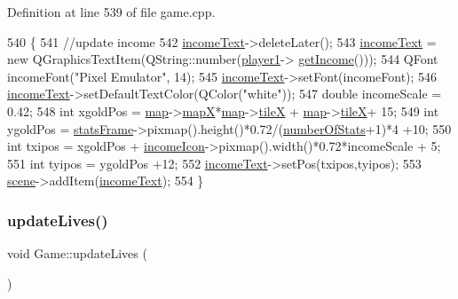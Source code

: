 Definition at line 539 of file game.\+cpp.


\begin{DoxyCode}
540 \{
541     \textcolor{comment}{//update income}
542     \hyperlink{class_game_a7d139b0ba0ef2a94966b138d5e77a034}{incomeText}->deleteLater();
543     \hyperlink{class_game_a7d139b0ba0ef2a94966b138d5e77a034}{incomeText} = \textcolor{keyword}{new} QGraphicsTextItem(QString::number(\hyperlink{class_game_ad8a7cc146f99c7ec5b7c3c25d73f118c}{player1}->
      \hyperlink{class_player1_a1bc2927827b94667b6f2d115ae95fb75}{getIncome}()));
544     QFont incomeFont(\textcolor{stringliteral}{"Pixel Emulator"}, 14);
545     \hyperlink{class_game_a7d139b0ba0ef2a94966b138d5e77a034}{incomeText}->setFont(incomeFont);
546     \hyperlink{class_game_a7d139b0ba0ef2a94966b138d5e77a034}{incomeText}->setDefaultTextColor(QColor(\textcolor{stringliteral}{"white"}));
547     \textcolor{keywordtype}{double} incomeScale = 0.42;
548     \textcolor{keywordtype}{int} xgoldPos = \hyperlink{class_game_acef3a39fdf14be2c980b0dc11e7be402}{map}->\hyperlink{class_map_acfd20721da29a2e353598555e23e12f0}{mapX}*\hyperlink{class_game_acef3a39fdf14be2c980b0dc11e7be402}{map}->\hyperlink{class_map_af2aa425dd22aba483ae973c4a15fe934}{tileX} + \hyperlink{class_game_acef3a39fdf14be2c980b0dc11e7be402}{map}->\hyperlink{class_map_af2aa425dd22aba483ae973c4a15fe934}{tileX}+ 15;
549     \textcolor{keywordtype}{int} ygoldPos = \hyperlink{class_game_a3b40718d348c0f12af63a3f428924ab4}{statsFrame}->pixmap().height()*0.72/(\hyperlink{class_game_af041d097dc2350360c7951e5a41bc48a}{numberOfStats}+1)*4 +10;
550     \textcolor{keywordtype}{int} txipos = xgoldPos + \hyperlink{class_game_a54671774169c28677974ee423a147c39}{incomeIcon}->pixmap().width()*0.72*incomeScale + 5;
551     \textcolor{keywordtype}{int} tyipos = ygoldPos +12;
552     \hyperlink{class_game_a7d139b0ba0ef2a94966b138d5e77a034}{incomeText}->setPos(txipos,tyipos);
553     \hyperlink{class_game_a8119e3b9a632906c6808fa294b46a92a}{scene}->addItem(\hyperlink{class_game_a7d139b0ba0ef2a94966b138d5e77a034}{incomeText});
554 \}
\end{DoxyCode}
\mbox{\label{class_game_aa5e4edca458d1a1378d035a138d69635}} 
\subsubsection{\texorpdfstring{update\+Lives()}{updateLives()}}
{\footnotesize\ttfamily void Game\+::update\+Lives (\begin{DoxyParamCaption}{ }\end{DoxyParamCaption})}



